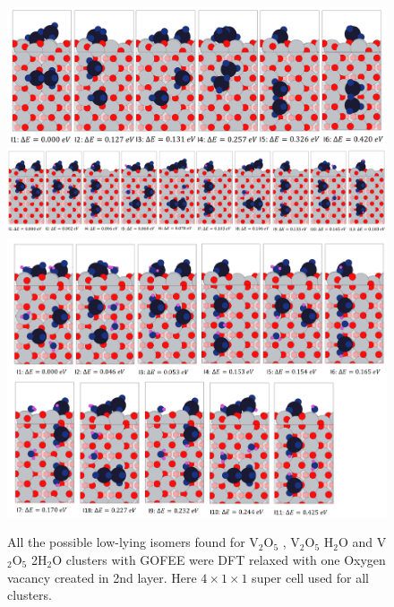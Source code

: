 \documentclass[aip,amsmath,amssymb,reprint, jcp]{revtex4-1}
\begin{document}
\begin{figure}
\centering
\includegraphics[width=1.0\textwidth]{V2O5_TiO2_101sur_4by1supercell.png}
\includegraphics[width=1.0\textwidth]{V2O5_H2O_TiO2_101sur_4by1supercell.png}
\includegraphics[width=1.0\textwidth]{V2O5_2H2O_TiO2_101sur_4by1supercell.png}
\caption{All the possible low-lying isomers found for V$_2$O$_5$  , V$_2$O$_5$ H$_2$O and V$_2$O$_5$ 2H$_2$O clusters with GOFEE were DFT relaxed with one Oxygen vacancy created in 2nd layer. Here $4 \times 1 \times 1$ super cell used for all clusters.}
\label{fig:exptobser}
\end{figure}
\end{document}
